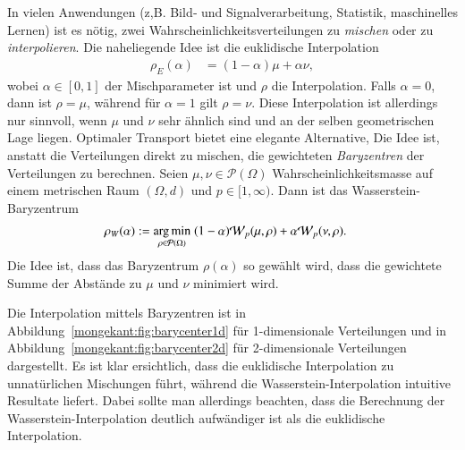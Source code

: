 In vielen Anwendungen
(z,B. Bild‑ und Signalverarbeitung, Statistik, maschinelles Lernen) ist es nötig,
zwei Wahrscheinlichkeitsverteilungen zu \emph{mischen}
oder zu \emph{interpolieren}.
Die naheliegende Idee ist die euklidische Interpolation
\begin{align}
\rho_E(\alpha)
&=
(1-\alpha) \mu + \alpha \nu
\label{mongekant:eq:euclidean_barycenter}
,
\end{align}
wobei $\alpha \in [0,1]$ der Mischparameter ist und $\rho$ die Interpolation.
Falls $\alpha=0$,
dann ist $\rho=\mu$,
während für $\alpha=1$ gilt $\rho=\nu$.
Diese Interpolation ist allerdings nur sinnvoll,
wenn $\mu$ und $\nu$ sehr ähnlich sind und an der selben geometrischen Lage liegen.
Optimaler Transport bietet eine elegante Alternative,
Die Idee ist,
anstatt die Verteilungen direkt zu mischen,
die gewichteten \emph{Baryzentren} der Verteilungen zu berechnen.
Seien $\mu, \nu \in \mathcal{P}(\Omega)$ Wahrscheinlichkeitsmasse
auf einem metrischen Raum $(\Omega, d)$
und $p \in [1, \infty)$.
Dann ist das Wasserstein-Baryzentrum
\begin{align}
\rho_W(\alpha)
&:=
\underset{\rho \in \mathcal{P}(\Omega)}{\mathrm{arg\,min}}\;
(1-\alpha) \wasserstein(\mu, \rho)
+ \alpha \wasserstein(\nu, \rho)
\label{mongekant:eq:wasserstein_barycenter}
.
\end{align}
Die Idee ist,
dass das Baryzentrum $\rho(\alpha)$
so gewählt wird,
dass die gewichtete Summe der Abstände zu $\mu$ und $\nu$ minimiert wird.

Die Interpolation mittels Baryzentren
ist in Abbildung~\ref{mongekant:fig:barycenter1d} für 1-dimensionale Verteilungen
und in Abbildung~\ref{mongekant:fig:barycenter2d} für 2-dimensionale Verteilungen
dargestellt.
Es ist klar ersichtlich,
dass die euklidische Interpolation
zu unnatürlichen Mischungen führt,
während die Wasserstein-Interpolation
intuitive Resultate liefert.
Dabei sollte man allerdings beachten,
dass die Berechnung der Wasserstein-Interpolation
deutlich aufwändiger ist als die euklidische Interpolation.

